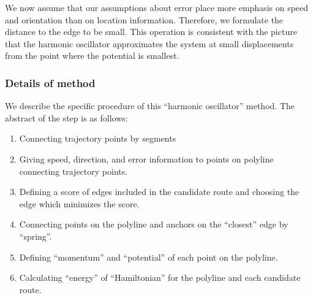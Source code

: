 \documentclass{article}
\numberwithin{equation}{section}
\theoremstyle{definition}
\begin{document}
We now assume that our assumptions about error place more emphasis on speed and orientation than on location information. Therefore, we formulate the distance to the edge to be small. This operation is consistent with the picture that the harmonic oscillator approximates the system at small displacements from the point where the potential is smallest.

\subsubsection{Details of method}
We describe the specific procedure of this ``harmonic oscillator'' method. 
The abstract of the step is as follows:
\begin{enumerate}
    \item
    Connecting trajectory points by segments
    \item
    Giving speed, direction, and error information to points on polyline connecting trajectory points.
    \item
    Defining a score of edges included in the candidate route and choosing the edge which minimizes the score.
    \item
    Connecting points on the polyline and anchors on the ``closest'' edge by ``spring''.
    \item
    Defining ``momentum'' and ``potential'' of each point on the polyline.
    \item
    Calculating ``energy'' of ``Hamiltonian'' for the polyline and each candidate route.
\end{enumerate}
\end{document}
